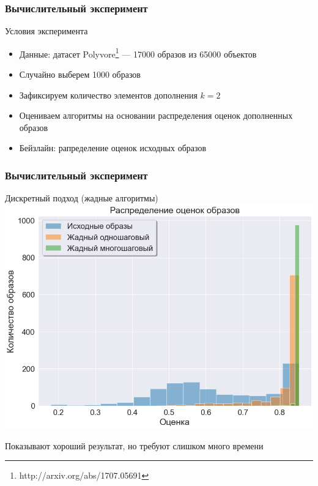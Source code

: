 \documentclass[10pt]{beamer}
\begin{document}
\begin{frame}
	\frametitle{Вычислительный эксперимент}
	\begin{block}{Условия эксперимента}
		\begin{itemize}
			\item Данные: датасет Polyvore\footnote{http://arxiv.org/abs/1707.05691} --- 17000 образов из 65000 объектов
			\item Случайно выберем 1000 образов 
			\item Зафиксируем количество элементов дополнения $k=2$
			\item Оцениваем алгоритмы на основании распределения оценок дополненных образов
			\item Бейзлайн: рапределение оценок исходных образов
		\end{itemize}
	\end{block}
\end{frame}


\begin{frame}
	\frametitle{Вычислительный эксперимент}
	\begin{block}{Дискретный подход (жадные алгоритмы)}
		\vspace{0.3cm}
		\includegraphics[scale = 0.5]{../figures/greedy_at_least_5_subset1000.png}
		
		Показывают хороший результат, но требуют слишком много времени
	\end{block}
\end{frame}
\end{document}
